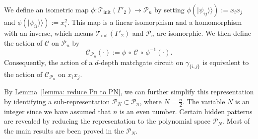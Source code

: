 \documentclass[showpacs,twocolumn,aps,prx,long bibliography,superscriptaddress,notitlepage]{revtex4-1}
\newcommand{\supket}[1]{|#1 \rangle\rangle}
\newcommand{\Tcal}{\mathcal{T}}
\begin{document}
We define an isometric map \(\phi: \Tcal_\text{init}(\Gamma'_2) \to \mathcal{P}_n\) by setting \(\phi(\supket{\psi_{ij}}) := x_i x_j\) and \(\phi(\supket{\psi_{ii}}) := x_i^2\). This map is a linear isomorphism and a homomorphism with an inverse, which means \(\Tcal_\text{init}(\Gamma'_2)\) and \(\mathcal{P}_n\) are isomorphic. We then define the action of \(\mathcal{C}\) on \(\mathcal{P}_n\) by
\begin{equation}
    \mathcal{C}_{\mathcal{P}_n}(\cdot) := \phi \,\circ\, \mathcal{C} \,\circ\, \phi^{-1} (\cdot).
\end{equation}
Consequently, the action of a \(d\)-depth matchgate circuit on \(\gamma_{\{i,j\}}\) is equivalent to the action of \(\mathcal{C}_{\mathcal{P}_n}\) on \(x_i x_j\).

By Lemma~\ref{lemma: reduce Pn to PN}, we can further simplify this representation by identifying a sub-representation \(\mathcal{P}_N \subset \mathcal{P}_n\), where \(N = \tfrac{n}{2}\). The variable \(N\) is an integer since we have assumed that $n$ is an even number. Certain hidden patterns are revealed by reducing the representation to the polynomial space $\mathcal{P}_N$. Most of the main results are been proved in the $\mathcal{P}_N$. 
\end{document}
